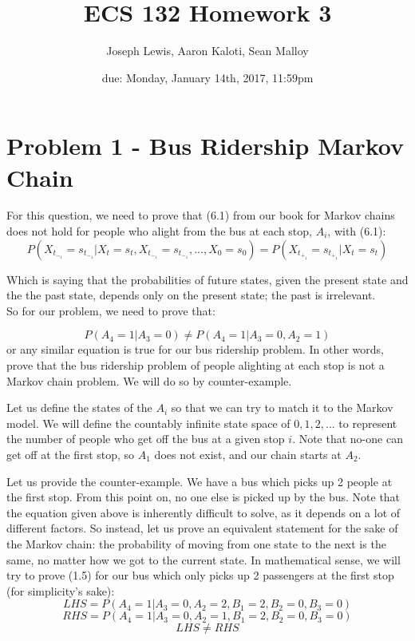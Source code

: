 \documentclass{article}
\title{ECS 132 Homework 3}
\author{Joseph Lewis, Aaron Kaloti, Sean Malloy}
\date{due: Monday, January 14th, 2017, 11:59pm}
\begin{document}
\maketitle

\section{Problem 1 - Bus Ridership Markov Chain}
For this question, we need to prove that (6.1) from our book for Markov chains does not hold for people who alight from the bus at each stop, $A_i$, with (6.1):
\begin{equation}
P(X_t_-_1 = s_t_-_1 | X_t = s_t, X_t_-_1 = s_t_-_1,...,X_0 = s_0) = P(X_t_+_1 = s_t_+_1 | X_t = s_t)
\end{equation}

Which is saying that the probabilities of future states, given the present state and the the past state, depends only on the present state; the past is irrelevant. 
\\ So for our problem, we need to prove that:

\begin{equation}
P(A_4 = 1 | A_3 = 0) \neq P(A_4 = 1 | A_3 = 0, A_2 = 1)
\end{equation}
or any similar equation is true for our bus ridership problem. In other words, prove that the bus ridership problem of people alighting at each stop is not a Markov chain problem.  We will do so by counter-example.

Let us define the states of the $A_i$ so that we can try to match it to the Markov model.  We will define the countably infinite state space of $0, 1, 2, ...$ to represent the number of people who get off the bus at a given stop $i$.  Note that no-one can get off at the first stop, so $A_1$ does not exist, and our chain starts at $A_2$.

Let us provide the counter-example.  We have a bus which picks up 2 people at the first stop.  From this point on, no one else is picked up by the bus.  Note that the equation given above is inherently difficult to solve, as it depends on a lot of different factors.  So instead, let us prove an equivalent statement for the sake of the Markov chain: the probability of moving from one state to the next is the same, no matter how we got to the current state.  In mathematical sense, we will try to prove (1.5) for our bus which only picks up 2 passengers at the first stop (for simplicity's sake):
\begin{equation}
    LHS = P(A_4 = 1 | A_3 = 0, A_2 = 2, B_1 = 2, B_2 = 0, B_3 = 0)
\end{equation}
\begin{equation}
    RHS = P(A_4 = 1 | A_3 = 0, A_2 = 1, B_1 = 2, B_2 = 0, B_3 = 0)
\end{equation}
\begin{equation}
    LHS \neq RHS
\end{equation}
\end{document}
